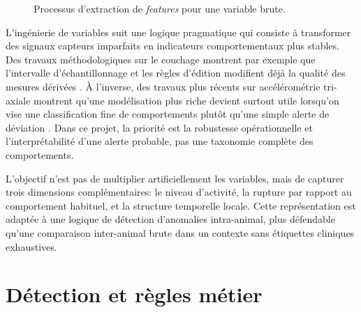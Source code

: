 \begin{figure}[H]
{%
    }
    \caption{Processus d'extraction de \textit{features} pour une variable brute.}
    \label{fig:feature_engineering}
\end{figure}

L'ingénierie de variables suit une logique pragmatique qui consiste à transformer des signaux
capteurs imparfaits en indicateurs comportementaux plus stables. Des travaux méthodologiques sur le
couchage montrent par exemple que l'intervalle d'échantillonnage et les règles d'édition
modifient déjà la qualité des mesures dérivées \citep{ledgerwood2010lying}. À l'inverse, des
travaux plus récents sur accélérométrie tri-axiale montrent qu'une modélisation plus riche
devient surtout utile lorsqu'on vise une classification fine de comportements plutôt qu'une
simple alerte de déviation \citep{balasso2023behaviour}. Dans ce projet, la priorité est la
robustesse opérationnelle et l'interprétabilité d'une alerte probable, pas une taxonomie
complète des comportements.

L'objectif n'est pas de multiplier artificiellement les variables, mais de capturer trois
dimensions complémentaires: le niveau d'activité, la rupture par rapport au comportement
habituel, et la structure temporelle locale. Cette représentation est adaptée à une
logique de détection d'anomalies intra-animal, plus défendable qu'une comparaison
inter-animal brute dans un contexte sans étiquettes cliniques exhaustives.

\FloatBarrier
\section{Détection et règles métier}

